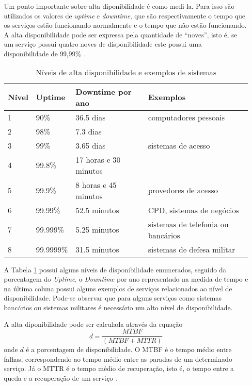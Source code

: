 Um ponto importante sobre alta diponibilidade é como medi-la. Para isso são utilizados os valores de \textit{uptime} e 
\textit{downtime}, que são respectivamente o tempo que os serviços estão funcionando normalmente e o tempo que não estão funcionando.
A alta disponibilidade pode ser expressa pela quantidade de ``noves'', isto é, se um serviço possui quatro noves de disponibilidade
este possui uma disponibilidade de 99,99\% \cite{pereirafilho2004}.

\begin{table}
\caption {Níveis de alta disponibilidade e exemplos de sistemas}
\label{tab:dispniveis}
\begin{center}
\begin{tabular}{|l|l|l|l|}\hline
Nível & Uptime & Downtime por ano & Exemplos\\\hline
1 & 90\% & 36.5 dias & computadores pessoais\\\hline
2 & 98\% & 7.3 dias & \\\hline
3 & 99\% & 3.65 dias & sistemas de acesso\\\hline
4 & 99.8\% & 17 horas e 30 minutos & \\\hline
5 & 99.9\% & 8 horas e 45 minutos & provedores de acesso\\\hline
6 & 99.99\% & 52.5 minutos & CPD, sistemas de negócios\\\hline
7 & 99.999\% & 5.25 minutos & sistemas de telefonia ou bancários\\\hline
8 & 99.9999\% & 31.5 minutos & sistemas de defesa militar\\\hline
\end{tabular}
\end{center}
\end{table}

A Tabela \ref{tab:dispniveis} possui alguns níveis de disponibilidade enumerados, seguido da porcentagem do \textit{Uptime}, 
o \textit{Downtime} por ano representado na medida de tempo e na última coluna possui alguns exemplos de serviços relacionados ao 
nível de disponibilidade. Pode-se observar que para alguns serviços como sistemas bancários ou sistemas militares é necessário um 
alto nível de disponibilidade.

A alta diponibilidade pode ser calculada através da equação
\begin{equation}
d = \frac{MTBF}{(MTBF + MTTR)}
\label{diponibilidade}
\end{equation}
onde $d$ é a porcentagem de disponibilidade. O \ac{MTBF} é o tempo médio entre falhas, correspondendo ao 
tempo médio entre as paradas de um determinado serviço. Já o \ac{MTTR} é o tempo médio de recuperação, isto é, 
o tempo entre a queda e a recuperação de um serviço \cite{goncalves2009}.

